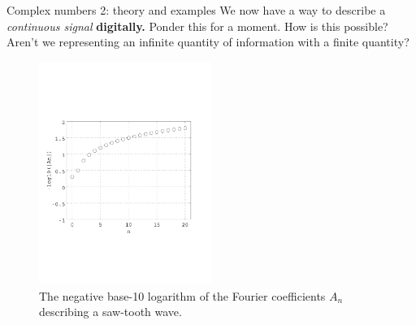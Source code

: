 \documentclass{beamer}
\begin{document}
\begin{frame}[fragile]{Complex numbers 2: theory and examples}
\small
We now have a way to describe a \textit{continuous signal} \textbf{\alert{digitally.}} Ponder this for a moment.  How is this possible?  Aren't we representing an infinite quantity of information with a finite quantity? \\ \vspace{0.5cm}
\begin{figure}
\centering
\includegraphics[width=0.5\textwidth,trim=1cm 6cm 1cm 7cm,clip=true]{figures/saw_coeff.pdf}
\caption{\label{fig:saw} The negative base-10 logarithm of the Fourier coefficients $A_n$ describing a saw-tooth wave.}
\end{figure}
\end{frame}
\end{document}

